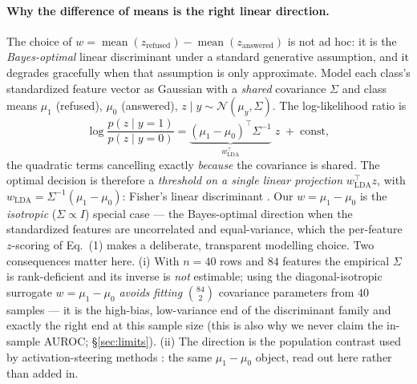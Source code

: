 \documentclass[11pt,a4paper]{article}
\begin{document}
\paragraph{Why the difference of means is the right linear direction.} The
choice of \(w = \operatorname{mean}(z_{\text{refused}}) -
\operatorname{mean}(z_{\text{answered}})\) is not ad hoc: it is the
\emph{Bayes-optimal} linear discriminant under a standard generative assumption,
and it degrades gracefully when that assumption is only approximate. Model each
class's standardized feature vector as Gaussian with a \emph{shared} covariance
\(\Sigma\) and class means \(\mu_1\) (refused), \(\mu_0\) (answered),
\(z \mid y \sim \mathcal{N}(\mu_y, \Sigma)\). The log-likelihood ratio is
\begin{equation}
  \log\frac{p(z\mid y{=}1)}{p(z\mid y{=}0)}
  = \underbrace{(\mu_1-\mu_0)^{\!\top}\Sigma^{-1}}_{\textstyle w_{\text{LDA}}^{\top}}
    \; z \;+\; \text{const},
  \label{eq:lda}
\end{equation}
the quadratic terms cancelling exactly \emph{because} the covariance is shared.
The optimal decision is therefore a \emph{threshold on a single linear
projection} \(w_{\text{LDA}}^{\top} z\), with
\(w_{\text{LDA}} = \Sigma^{-1}(\mu_1-\mu_0)\): Fisher's linear discriminant
\citep{fisher1936lda,hastie2009esl}. Our \(w = \mu_1 - \mu_0\) is the
\emph{isotropic} (\(\Sigma \propto I\)) special case --- the Bayes-optimal
direction when the standardized features are uncorrelated and equal-variance,
which the per-feature \(z\)-scoring of Eq.~(1) makes a deliberate, transparent
modelling choice. Two consequences matter here. (i) With \(n{=}40\) rows and
\(84\) features the empirical \(\Sigma\) is rank-deficient and its inverse is
\emph{not} estimable; using the diagonal-isotropic surrogate \(w=\mu_1-\mu_0\)
\emph{avoids fitting} \(\binom{84}{2}\) covariance parameters from \(40\)
samples --- it is the high-bias, low-variance end of the discriminant family and
exactly the right end at this sample size (this is also why we never claim the
in-sample AUROC; \S\ref{sec:limits}). (ii) The direction is the population
contrast used by activation-steering methods \citep{turner2023actadd}: the same
\(\mu_1-\mu_0\) object, read out here rather than added in.
\end{document}
